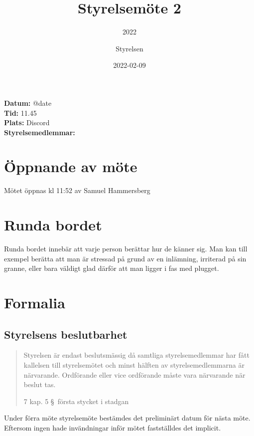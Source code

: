 \documentclass[protokoll]{dvd}
\begin{document}
\title{Styrelsemöte 2}
\subtitle{2022}
\author{Styrelsen}
\date{2022-02-09}

\textbf{Datum:} \csname @date\endcsname\\
\textbf{Tid:} 11.45\\
\textbf{Plats:} Discord\\
\textbf{Styrelsemedlemmar:}
\begin{närvarande_förtroendevalda}
\end{närvarande_förtroendevalda}


\section{Öppnande av möte}

Mötet öppnas kl 11:52 av Samuel Hammersberg

\section{Runda bordet}

    Runda bordet innebär att varje person berättar hur de känner sig.
    Man kan till exempel berätta att man är stressad på grund av en inlämning, irriterad på sin granne, eller bara väldigt glad därför att man ligger i fas med plugget.

\section{Formalia}

    \subsection{Styrelsens beslutbarhet}

        \blockquote[7 kap. 5 \S~första stycket i stadgan][]{
            Styrelsen är endast beslutsmässig då samtliga styrelsemedlemmar har fått kallelsen till styrelsemötet och minst hälften av styrelsemedlemmarna är närvarande.
            Ordförande eller vice ordförande måste vara närvarande när beslut tas.
        }

        Under förra möte styrelsemöte bestämdes det preliminärt datum för nästa möte. Eftersom ingen hade invändningar inför mötet fastställdes det implicit. 
\end{document}
